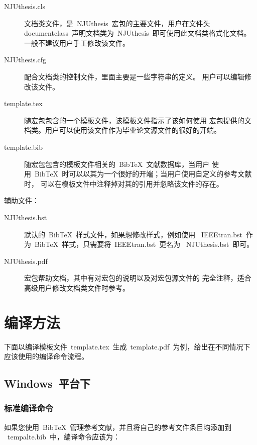 \documentclass[oneside, phd]{njuthesis}
\begin{document}
\begin{description}
\item[NJUthesis.cls] 文档类文件，是~NJUthesis~宏包的主要文件，用户在文件头
  ~\\documentclass~声明文档类为~NJUthesis~即可使用此文档类格式化文档。
  一般不建议用户手工修改该文件。

\item[NJUthesis.cfg] 配合文档类的控制文件，里面主要是一些字符串的定义。
  用户可以编辑修改该文件。

\item[template.tex] 随宏包包含的一个模板文件，该模板文件指示了该如何使用
  宏包提供的文档类。用户可以使用该文件作为毕业论文源文件的很好的开端。

\item[template.bib] 随宏包包含的模板文件相关的~BibTeX~文献数据库，当用户
  使用~BibTeX~时可以以其为一个很好的开端；当用户使用自定义的参考文献时，
  可以在模板文件中注释掉对其的引用并忽略该文件的存在。
\end{description}

辅助文件：

\begin{description}
\item[NJUthesis.bst] 默认的~BibTeX~样式文件，如果想修改样式，例如使用
  ~IEEEtran.bst~作为~BibTeX~样式，只需要将~IEEEtran.bst~更名为
  ~NJUthesis.bst~即可。

\item[NJUthesis.pdf] 宏包帮助文档，其中有对宏包的说明以及对宏包源文件的
  完全注释，适合高级用户修改文档类文件时参考。
\end{description}

\section{编译方法}

下面以编译模板文件~template.tex~生成~template.pdf~为例，给出在不同情况下
应该使用的编译命令流程。

\subsection{Windows~平台下}

\subsubsection{标准编译命令}

如果您使用~BibTeX~管理参考文献，并且将自己的参考文件条目均添加到
~tempalte.bib~中，编译命令应该为：
\end{document}
